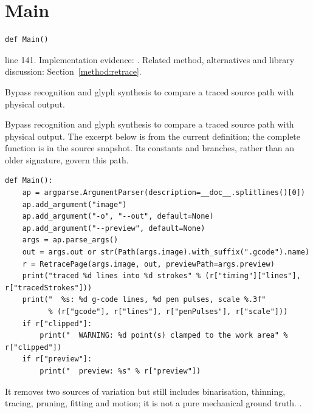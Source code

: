 \section{Main}\label{fn:retrace:Main}
\begin{lstlisting}[style=sig]
def Main()
\end{lstlisting}
 line 141. Implementation evidence: \cite{code2026}. Related method, alternatives and library discussion: Section~\ref{method:retrace}.


Bypass recognition and glyph synthesis to compare a traced source path with physical output.


Bypass recognition and glyph synthesis to compare a traced source path with physical output. The excerpt below is from the current definition; the complete function is in the source snapshot. Its constants and branches, rather than an older signature, govern this path.


\begin{lstlisting}[style=plain]
def Main():
    ap = argparse.ArgumentParser(description=__doc__.splitlines()[0])
    ap.add_argument("image")
    ap.add_argument("-o", "--out", default=None)
    ap.add_argument("--preview", default=None)
    args = ap.parse_args()
    out = args.out or str(Path(args.image).with_suffix(".gcode").name)
    r = RetracePage(args.image, out, previewPath=args.preview)
    print("traced %d lines into %d strokes" % (r["timing"]["lines"], r["tracedStrokes"]))
    print("  %s: %d g-code lines, %d pen pulses, scale %.3f"
          % (r["gcode"], r["lines"], r["penPulses"], r["scale"]))
    if r["clipped"]:
        print("  WARNING: %d point(s) clamped to the work area" % r["clipped"])
    if r["preview"]:
        print("  preview: %s" % r["preview"])
\end{lstlisting}
It removes two sources of variation but still includes binarisation, thinning, tracing, pruning, fitting and motion; it is not a pure mechanical ground truth. \cite{code2026,zhangsuen1984,douglaspeucker1973}.

